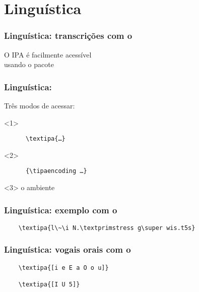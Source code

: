 \section{Linguística}

\begin{frame}
  \frametitle{Linguística: transcrições com o }
  \huge
  O IPA é facilmente acessível\\ usando o pacote 
\end{frame}

\begin{frame}[fragile]
  \frametitle{Linguística: }
  \huge

  Três modos de acessar:
  \begin{onlyenv}<1>
    \begin{verbatim}
      \textipa{…}
    \end{verbatim}
  \end{onlyenv}

  \begin{onlyenv}<2>
    \begin{verbatim}
      {\tipaencoding …}
    \end{verbatim}
  \end{onlyenv}

  \begin{onlyenv}<3>
    o ambiente 
  \end{onlyenv}
\end{frame}

\begin{frame}[fragile]
  \frametitle{Linguística: exemplo com o }
  \huge

  \begin{verbatim}
    \textipa{l\~\i N.\textprimstress g\super wis.t5s}
  \end{verbatim}

\end{frame}

\begin{frame}[fragile]
  \frametitle{Linguística: vogais orais com o }
  \huge

  \begin{verbatim}
    \textipa{[i e E a O o u]}

    \textipa{[I U 5]}
  \end{verbatim}

  \textipa{[i e E a O o u]}

  \textipa{[I U 5]}
\end{frame}

